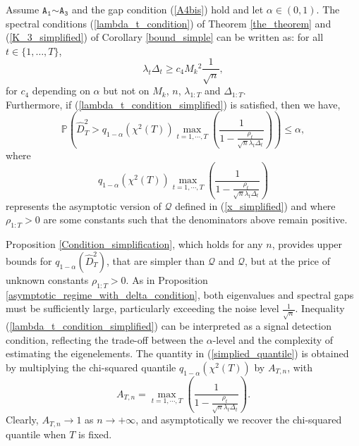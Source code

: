 \documentclass[twoside,11pt]{article}
\newcommand{\nb}{n}
\newcommand{\PPO}{\mathbb{P} }
\newcommand{\A}[1]{$\mathtt{A_#1}$}
\newcommand{\trueq}[1]{q_{1-\alpha}(#1) }
\newcommand{\qmaj}{\mathcal{Q}}
\newcommand{\qmajbis}{\mathscr{Q}}
\begin{document}
\begin{proposition}
Assume \A{1}$\sim$\A{3} and the gap condition (\ref{A4bis}) hold and let $\alpha \in (0,1)$. The spectral conditions (\ref{lambda_t_condition}) of Theorem \ref{the_theorem} and (\ref{K_3_simplified}) of Corollary \ref{bound_simple} can be written as: for all $t \in \{1,\ldots,T\}$,
\begin{equation}
    \lambda_t \Delta_t \geq c_4 M_k{^2} \frac{1}{\sqrt{\nb}},
    \label{lambda_t_condition_simplified}
\end{equation}
for $c_4$ depending on $\alpha$ but not on $M_k$, $\nb$, $\lambda_{1:T}$ and $\Delta_{1:T}$. \\
Furthermore, if (\ref{lambda_t_condition_simplified}) is satisfied, then we have, 
 \begin{equation}
         \PPO \left(\widehat{D}^2_T >  \trueq{\chi^2(T)} \underset{t=1,\cdots,T}{\max} \left( \frac{1}{1 - \frac{\rho_t}{\sqrt{\nb} \lambda_t \Delta_t}} \right)
 \right) \leq  \alpha,
         \label{our_used_quantile}
     \end{equation}
     where
     \begin{equation}
         \trueq{\chi^2(T)} \underset{t=1,\cdots,T}{\max} \left( \frac{1}{1 - \frac{\rho_t}{\sqrt{\nb} \lambda_t \Delta_t}} \right)
        \label{simplied_quantile}
    \end{equation}
represents the asymptotic version of $\qmajbis$ defined in (\ref{x_simplified}) and where $\rho_{1:T} >0$ are some constants such that the denominators above remain positive.  
\label{Condition_simplification}
\end{proposition}
Proposition \ref{Condition_simplification}, which holds for any $n$, provides upper bounds for $\trueq{\widehat{D}^2_T}$, that are simpler than $\qmaj$ and $\qmajbis$, but at the price of unknown constants $\rho_{1:T} >0$. As in Proposition \ref{asymptotic_regime_with_delta_condition}, both eigenvalues and spectral gaps must be sufficiently large, particularly exceeding the noise level $\frac{1}{\sqrt{\nb}}$. Inequality (\ref{lambda_t_condition_simplified}) can be interpreted as a signal detection condition, reflecting the trade-off between the $\alpha$-level and the complexity of estimating the eigenelements. The quantity in (\ref{simplied_quantile}) is obtained by multiplying the chi-squared quantile  $\trueq{\chi^2(T)}$ by $A_{T,n}$, with
$$A_{T,n}=\underset{t=1,\cdots,T}{\max} \left( \frac{1}{1 - \frac{\rho_t}{\sqrt{\nb} \lambda_t \Delta_t}} \right).$$
Clearly, $A_{T,n} \to 1$ as $n \to +\infty$, and asymptotically we recover the chi-squared quantile when $T$ is fixed.
\end{document}
